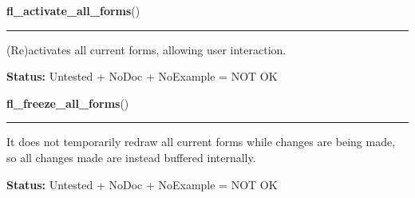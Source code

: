     \label{xformslib:library:fl_activate_all_forms}

    \vspace{0.5ex}

\hspace{.8\funcindent}\begin{boxedminipage}{\funcwidth}

    \raggedright \textbf{fl\_activate\_all\_forms}()

    \vspace{-1.5ex}

    \rule{\textwidth}{0.5\fboxrule}
\setlength{\parskip}{2ex}
    (Re)activates all current forms, allowing user interaction.

\setlength{\parskip}{1ex}
\textbf{Status:} Untested + NoDoc + NoExample = NOT OK



    \end{boxedminipage}

    \label{xformslib:library:fl_freeze_all_forms}

    \vspace{0.5ex}

\hspace{.8\funcindent}\begin{boxedminipage}{\funcwidth}

    \raggedright \textbf{fl\_freeze\_all\_forms}()

    \vspace{-1.5ex}

    \rule{\textwidth}{0.5\fboxrule}
\setlength{\parskip}{2ex}
    It does not temporarily redraw all current forms while changes are 
    being made, so all changes made are instead buffered internally.

\setlength{\parskip}{1ex}
\textbf{Status:} Untested + NoDoc + NoExample = NOT OK



    \end{boxedminipage}

    \label{xformslib:library:fl_unfreeze_all_forms}

    \vspace{0.5ex}

